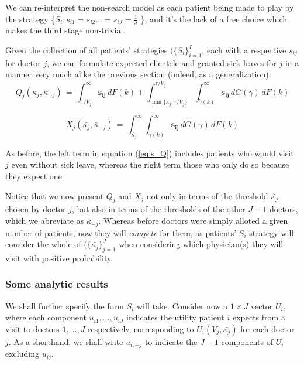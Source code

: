 \documentclass[../main.tex]{subfiles}
\begin{document}
We can re-interpret the non-search model as each patient being made to play by the strategy \{$S_i: s_{i1} = s_{i2} ... = s_{iJ} = \frac{1}{J}$ \}, and it's the lack of a free choice which makes the third stage non-trivial.

Given the collection of all patients' strategies $(\{S_i\}_{i =1}^{I}$, each with a respective $s_{ij}$ for doctor $j$, we can formulate expected clientele and granted sick leaves for $j$ in a manner very much alike the previous section (indeed, as a generalization):
\begin{equation}
    Q_j(\bar{\kappa_j}, \bar{\kappa}_{-j}) \,=\, \int_{\tau/V_j}^{\infty}\bm{s_{ij}}\,dF(k) +  \int_{\min\{\bar{\kappa_j},\tau/V_j\}}^{\tau/V_j} \int_{\tilde{\gamma}(k)}^{\infty}\bm{s_{ij}} \,dG(\gamma) \,dF(k) 
    \tag{S.1}\label{eq:s_Q}
\end{equation}

\begin{equation}
    X_j(\bar{\kappa_j}, \bar{\kappa}_{-j}) \,=\, \int_{\bar{\kappa_j}}^{\infty} \int_{\tilde{\gamma}(k)}^{\infty}\bm{s_{ij}} \,dG(\gamma) \,dF(k)
    \tag{S.2}\label{eq:s_X}
\end{equation}

As before, the left term in equation (\ref{eq:s_Q}) includes patients who would visit $j$ even without sick leave, whereas the right term those who only do so because they expect one.

Notice that we now present $Q_j$ and $X_j$  not only in terms of the threshold $\bar{\kappa_j}$ chosen by doctor $j$, but also in terms of the thresholds of the other $J - 1$ doctors, which we abreviate as $\bar{\kappa}_{-j}$. Whereas before doctors were simply alloted a given number of patients, now they will \textit{compete} for them, as patients' $S_i$ strategy will consider the whole of $(\{\bar{\kappa_j}\}_{j =1}^{J}$ when considering which physician(s) they will visit with positive probability.

\subsubsection{Some analytic results}

We shall further specify the form $S_i$ will take. Consider now a $1 \times J$ vector $U_i$, where each component $u_{i1}, ... , u_{iJ}$ indicates the utility patient $i$ expects from a visit to doctors $1, ..., J$ respectively, corresponding to $U_i(V_j, \bar{\kappa_j})$ for each doctor $j$. As a shorthand, we shall write $u_{i,-j}$ to indicate the $J - 1$ components of $U_i$ excluding $u_{ij}$.
\end{document}
